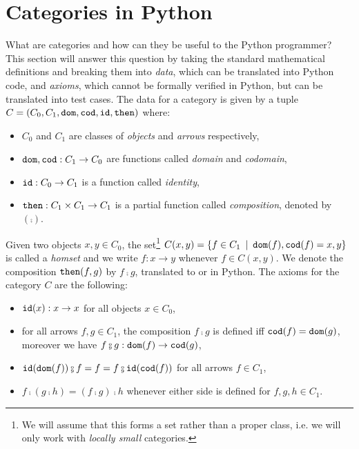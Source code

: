 
\section{Categories in Python} \label{section:cat}

What are categories and how can they be useful to the Python programmer?
This section will answer this question by taking the standard mathematical definitions and breaking them into \emph{data}, which can be translated into Python code, and \emph{axioms}, which cannot be formally verified in Python, but can be translated into test cases.
The data for a category is given by a tuple $C = (C_0, C_1, \mathtt{dom}, \mathtt{cod}, \mathtt{id}, \mathtt{then})$ where:
\begin{itemize}
\item $C_0$ and $C_1$ are classes of \emph{objects} and \emph{arrows} respectively,
\item $\mathtt{dom}, \mathtt{cod} : C_1 \to C_0$ are functions called \emph{domain} and \emph{codomain},
\item $\mathtt{id} : C_0 \to C_1$ is a function called \emph{identity},
\item $\mathtt{then} : C_1 \times C_1 \to C_1$ is a partial function called \emph{composition}, denoted by $(\fcmp)$.
\end{itemize}
Given two objects $x, y \in C_0$, the set\footnote
{We will assume that this forms a set rather than a proper class, i.e. we will only work with \emph{locally small} categories.}
$C(x, y) = \{f \in C_1 \enspace \vert \enspace \mathtt{dom}(f), \mathtt{cod}(f) = x, y \}$ is called a \emph{homset} and we write $f : x \to y$ whenever $f \in C(x, y)$.
We denote the composition $\mathtt{then}(f, g)$ by $f \fcmp g$, translated to  or  in Python.
The axioms for the category $C$ are the following:
\begin{itemize}
\item $\mathtt{id}(x) : x \to x$ for all objects $x \in C_0$,
\item for all arrows $f, g \in C_1$, the composition $f \fcmp g$ is defined iff $\mathtt{cod}(f) = \mathtt{dom}(g)$, moreover we have $f \fcmp g : \dom(f) \to \cod(g)$,
\item $\id(\dom(f)) \fcmp f = f = f \fcmp \id(\cod(f))$ for all arrows $f \in C_1$,
\item $f \fcmp (g \fcmp h) = (f \fcmp g) \fcmp h$ whenever either side is defined for $f, g, h \in C_1$.
\end{itemize}

